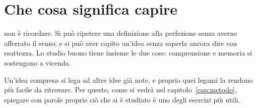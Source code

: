 \chapter{Che cosa significa capire}
\label{cap:capire}

 non è ricordare. Si può ripetere una definizione
alla perfezione senza averne afferrato il senso; e si può aver capito
un'idea senza saperla ancora dire con esattezza. Lo studio buono tiene
insieme le due cose: comprensione e memoria si sostengono a vicenda.

Un'idea compresa si lega ad altre idee già note, e proprio quei legami
la rendono più facile da ritrovare. Per questo, come si vedrà nel
capitolo~\ref{cap:metodo}, spiegare con parole proprie ciò che si è
studiato è uno degli esercizi più utili.

\finecapitolo
